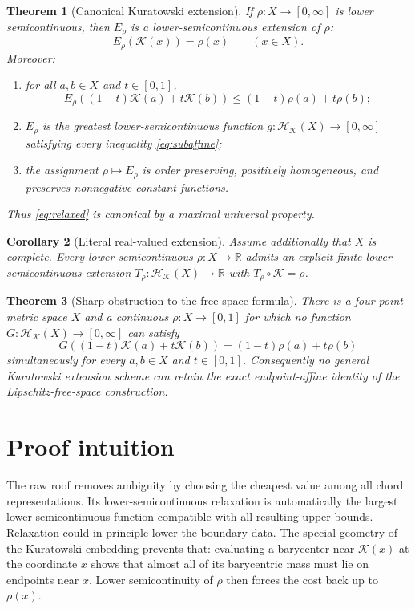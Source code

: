 \documentclass[11pt]{article}
\newtheorem{theorem}{Theorem}
\newtheorem{corollary}[theorem]{Corollary}
\newcommand{\R}{\mathbb R}
\newcommand{\K}{\mathcal K}
\newcommand{\Hh}{\mathcal H}
\begin{document}
\begin{theorem}[Canonical Kuratowski extension]\label{thm:main}
If $\rho:X\to[0,\infty]$ is lower semicontinuous, then $E_\rho$ is a
lower-semicontinuous extension of $\rho$:
\[
 E_\rho(\K(x))=\rho(x)\qquad(x\in X).
\]
Moreover:
\begin{enumerate}
\item for all $a,b\in X$ and $t\in[0,1]$,
\begin{equation}\label{eq:subaffine}
E_\rho((1-t)\K(a)+t\K(b))
\le (1-t)\rho(a)+t\rho(b);
\end{equation}
\item $E_\rho$ is the greatest lower-semicontinuous function
$g:\Hh_{\K}(X)\to[0,\infty]$ satisfying every inequality
\eqref{eq:subaffine};
\item the assignment $\rho\mapsto E_\rho$ is order preserving, positively
homogeneous, and preserves nonnegative constant functions.
\end{enumerate}
Thus \eqref{eq:relaxed} is canonical by a maximal universal property.
\end{theorem}

\begin{corollary}[Literal real-valued extension]\label{cor:real}
Assume additionally that $X$ is complete.  Every lower-semicontinuous
$\rho:X\to\R$ admits an explicit finite lower-semicontinuous extension
$T_\rho:\Hh_{\K}(X)\to\R$ with
$T_\rho\circ\K=\rho$.
\end{corollary}

\begin{theorem}[Sharp obstruction to the free-space formula]\label{thm:c4}
There is a four-point metric space $X$ and a continuous
$\rho:X\to[0,1]$ for which no function
$G:\Hh_{\K}(X)\to[0,\infty]$ can satisfy
\[
G((1-t)\K(a)+t\K(b))=(1-t)\rho(a)+t\rho(b)
\]
simultaneously for every $a,b\in X$ and $t\in[0,1]$.
Consequently no general Kuratowski extension scheme can retain the exact
endpoint-affine identity of the Lipschitz-free-space construction.
\end{theorem}

\section{Proof intuition}

The raw roof removes ambiguity by choosing the cheapest value among all chord
representations.  Its lower-semicontinuous relaxation is automatically the
largest lower-semicontinuous function compatible with all resulting upper
bounds.  Relaxation could in principle lower the boundary data.  The special
geometry of the Kuratowski embedding prevents that: evaluating a barycenter
near $\K(x)$ at the coordinate $x$ shows that almost all of its barycentric
mass must lie on endpoints near $x$.  Lower semicontinuity of $\rho$ then
forces the cost back up to $\rho(x)$.
\end{document}
